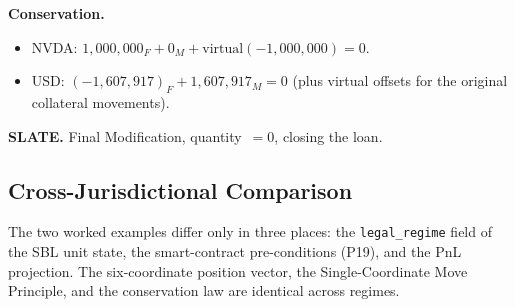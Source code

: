 \medskip
\noindent\textbf{Conservation.}
\begin{itemize}[nosep]
\item NVDA: $1{,}000{,}000_F + 0_M + \text{virtual}(-1{,}000{,}000) = 0$. \checkmark
\item USD: $(-1{,}607{,}917)_F + 1{,}607{,}917_M = 0$ (plus virtual offsets for the original collateral movements). \checkmark
\end{itemize}

\noindent\textbf{SLATE.} Final Modification, quantity~$=0$, closing the loan.

\subsection{Cross-Jurisdictional Comparison}
\label{sec:sbl-comparison}

The two worked examples differ only in three places: the \texttt{legal\_regime} field of the SBL unit state, the smart-contract pre-conditions (P19), and the PnL projection. The six-coordinate position vector, the Single-Coordinate Move Principle, and the conservation law are identical across regimes.

